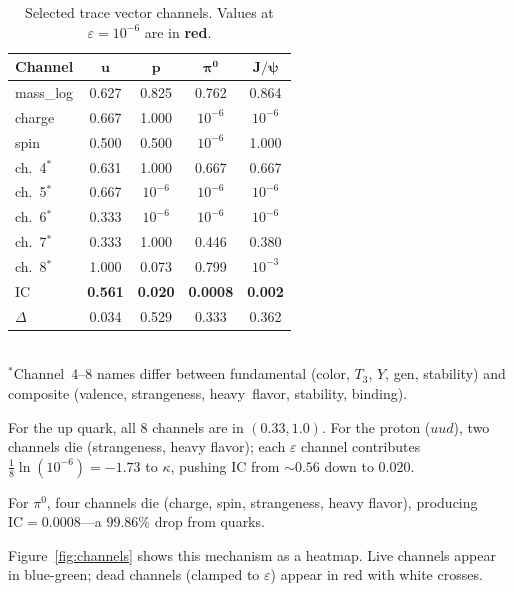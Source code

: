 \documentclass[
  aps,
  prd,
  twocolumn,
  superscriptaddress,
  nofootinbib,
  floatfix
]{revtex4-2}
\newcommand{\eps}{\varepsilon}
\newcommand{\IC}{\mathrm{IC}}
\begin{document}
\begin{table}[H]
\caption{Selected trace vector channels.
Values at $\eps = 10^{-6}$ are in
\textcolor{CliffRed}{\textbf{red}}.}
\label{tab:channels}
\centering\small
\begin{tabular}{@{}lcccc@{}}
\toprule
\textbf{Channel} & $\bm{u}$ & $\bm{p}$ &
  $\bm{\pi^0}$ & $\bm{J/\psi}$ \\
\midrule
mass\_log   & 0.627 & 0.825 & 0.762 & 0.864 \\
charge      & 0.667 & 1.000 &
  \textcolor{CliffRed}{$10^{-6}$} &
  \textcolor{CliffRed}{$10^{-6}$} \\
spin        & 0.500 & 0.500 &
  \textcolor{CliffRed}{$10^{-6}$} & 1.000 \\
ch.~4$^{*}$ & 0.631 & 1.000 & 0.667 & 0.667 \\
ch.~5$^{*}$ & 0.667 &
  \textcolor{CliffRed}{$10^{-6}$} &
  \textcolor{CliffRed}{$10^{-6}$} &
  \textcolor{CliffRed}{$10^{-6}$} \\
ch.~6$^{*}$ & 0.333 &
  \textcolor{CliffRed}{$10^{-6}$} &
  \textcolor{CliffRed}{$10^{-6}$} &
  \textcolor{CliffRed}{$10^{-6}$} \\
ch.~7$^{*}$ & 0.333 & 1.000 & 0.446 & 0.380 \\
ch.~8$^{*}$ & 1.000 & 0.073 & 0.799 & $10^{-3}$ \\
\midrule
$\IC$       & \textbf{0.561} & \textbf{0.020} &
  \textbf{0.0008} & \textbf{0.002} \\
$\Delta$    & 0.034 & 0.529 & 0.333 & 0.362 \\
\bottomrule
\end{tabular}\\[4pt]
{\footnotesize $^{*}$Channel~4--8 names differ between fundamental
(color, $T_3$, $Y$, gen, stability) and composite (valence,
strangeness, heavy~flavor, stability, binding).}
\end{table}

For the up quark, all 8 channels are in $(0.33, 1.0)$.  For the
proton ($uud$), two channels die (strangeness, heavy flavor); each
$\eps$ channel contributes $\frac{1}{8}\ln(10^{-6}) = -1.73$ to
$\kappa$, pushing IC from $\sim 0.56$ down to $0.020$.

For $\pi^0$, four channels die (charge, spin, strangeness, heavy
flavor), producing $\IC = 0.0008$---a $99.86\%$ drop from quarks.

Figure~\ref{fig:channels} shows this mechanism as a heatmap.
Live channels appear in blue-green; dead channels
(clamped to $\eps$) appear in red with white crosses.
\end{document}
